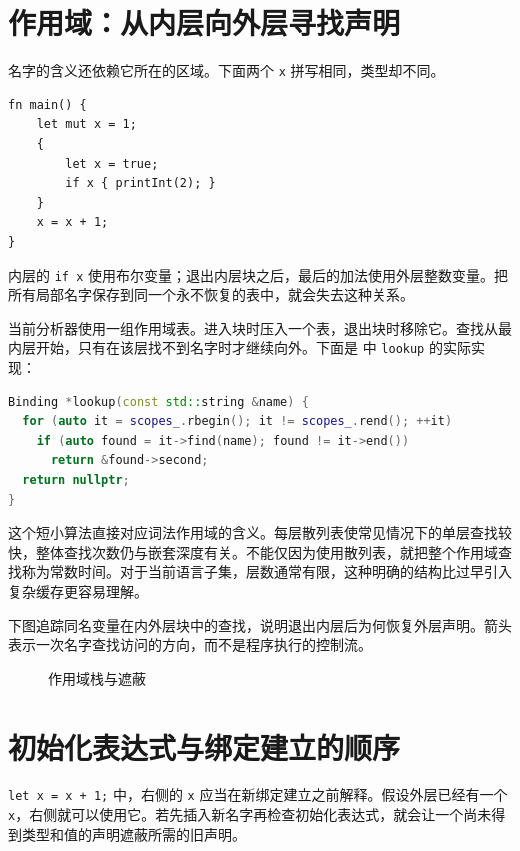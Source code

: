 \section{作用域：从内层向外层寻找声明}
名字的含义还依赖它所在的区域。下面两个 \lstinline[language=Rustless]|x| 拼写相同，类型却不同。
\begin{lstlisting}[language=Rustless]
fn main() {
    let mut x = 1;
    {
        let x = true;
        if x { printInt(2); }
    }
    x = x + 1;
}
\end{lstlisting}
内层的 \lstinline[language=Rustless]|if x| 使用布尔变量；退出内层块之后，最后的加法使用外层整数变量。把所有局部名字保存到同一个永不恢复的表中，就会失去这种关系。

当前分析器使用一组作用域表。进入块时压入一个表，退出块时移除它。查找从最内层开始，只有在该层找不到名字时才继续向外。下面是  中 \texttt{lookup} 的实际实现：
\begin{lstlisting}[language=C++]
Binding *lookup(const std::string &name) {
  for (auto it = scopes_.rbegin(); it != scopes_.rend(); ++it)
    if (auto found = it->find(name); found != it->end())
      return &found->second;
  return nullptr;
}
\end{lstlisting}
这个短小算法直接对应词法作用域的含义。每层散列表使常见情况下的单层查找较快，整体查找次数仍与嵌套深度有关。不能仅因为使用散列表，就把整个作用域查找称为常数时间。对于当前语言子集，层数通常有限，这种明确的结构比过早引入复杂缓存更容易理解。

下图追踪同名变量在内外层块中的查找，说明退出内层后为何恢复外层声明。箭头表示一次名字查找访问的方向，而不是程序执行的控制流。
\begin{figure}[htbp]
\centering
{}
\caption{作用域栈与遮蔽}
\end{figure}

\section{初始化表达式与绑定建立的顺序}
\lstinline[language=Rustless]|let x = x + 1;| 中，右侧的 \lstinline[language=Rustless]|x| 应当在新绑定建立之前解释。假设外层已经有一个 \lstinline[language=Rustless]|x|，右侧就可以使用它。若先插入新名字再检查初始化表达式，就会让一个尚未得到类型和值的声明遮蔽所需的旧声明。

